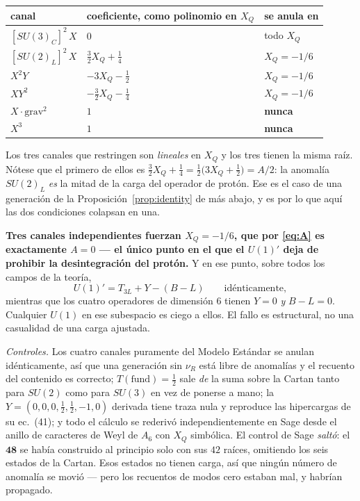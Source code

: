 \documentclass[11pt,a4paper]{article}
\newcommand{\su}[1]{SU(#1)}
\newcommand{\rep}[1]{\mathbf{#1}}
\newenvironment{keyeq}
  {\begin{center}\setlength{\fboxsep}{9pt}\setlength{\fboxrule}{0.8pt}%
   \begin{lrbox}{\keyeqbox}\begin{minipage}{0.88\textwidth}}
  {\end{minipage}\end{lrbox}%
   \fcolorbox{hdrblue!55}{hdrblue!6}{\usebox{\keyeqbox}}\end{center}}
\begin{document}
\begin{center}\small
\begin{tabular}{lll}
\toprule
\rowcolor{hdrblue!12}
canal & coeficiente, como polinomio en $X_Q$ & se anula en\\
\midrule
$[\su3_C]^2\,X$ & $0$ & todo $X_Q$\\
\rowcolor{amber!13}
$[\su2_L]^2\,X$ & $\tfrac32X_Q+\tfrac14$ & $X_Q=-1/6$\\
\rowcolor{amber!13}
$X^2Y$ & $-3X_Q-\tfrac12$ & $X_Q=-1/6$\\
\rowcolor{amber!13}
$XY^2$ & $-\tfrac32X_Q-\tfrac14$ & $X_Q=-1/6$\\
\rowcolor{warmred!13}
$X\cdot\mathrm{grav}^2$ & $1$ & \textbf{nunca}\\
\rowcolor{warmred!13}
$X^3$ & $1$ & \textbf{nunca}\\
\bottomrule
\end{tabular}
\end{center}

Los tres canales que restringen son \emph{lineales} en $X_Q$ y los tres tienen la misma raíz.
Nótese que el primero de ellos es $\tfrac32X_Q+\tfrac14=\tfrac12\big(3X_Q+\tfrac12\big)=A/2$: la
anomalía $\su2_L$ \emph{es} la mitad de la carga del operador de protón. Ese es el caso de una
generación de la Proposición~\ref{prop:identity} de más abajo, y es por lo que aquí las dos
condiciones colapsan en una.

\begin{keyeq}
\textbf{Tres canales independientes fuerzan $X_Q=-1/6$, que por \eqref{eq:A} es exactamente $A=0$
--- el único punto en el que el $U(1)'$ deja de prohibir la desintegración del protón.} Y en ese
punto, sobre todos los campos de la teoría,
\[
U(1)'=T_{3L}+Y-(B-L)\qquad\text{idénticamente},
\]
mientras que los cuatro operadores de dimensión 6 tienen $Y=0$ \emph{y} $B-L=0$. Cualquier $U(1)$ en
ese subespacio es ciego a ellos. El fallo es estructural, no una casualidad de una carga ajustada.
\end{keyeq}

\emph{Controles.} Los cuatro canales puramente del Modelo Estándar se anulan idénticamente, así que
una generación sin $\nu_R$ está libre de anomalías y el recuento del contenido es correcto;
$T(\text{fund})=\tfrac12$ sale \emph{de} la suma sobre la Cartan tanto para $\su2$ como para $\su3$
en vez de ponerse a mano; la $Y=(0,0,0,\tfrac12,\tfrac12,-1,0)$ derivada tiene traza nula y reproduce
las hipercargas de su ec.~(41); y todo el cálculo se rederivó independientemente en Sage desde el
anillo de caracteres de Weyl de $A_6$ con $X_Q$ simbólica. El control de Sage \emph{saltó}: el
$\rep{48}$ se había construido al principio solo con sus $42$ raíces, omitiendo los seis estados de
la Cartan. Esos estados no tienen carga, así que ningún número de anomalía se movió --- pero los
recuentos de modos cero estaban mal, y habrían propagado.
\end{document}

